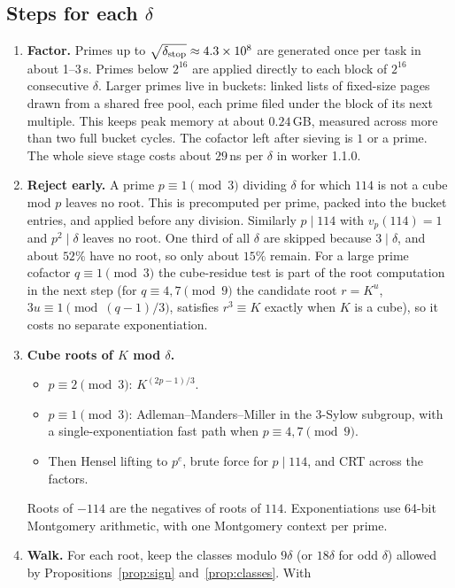 \documentclass[11pt,a4paper]{article}
\theoremstyle{remark}
\begin{document}
\subsection{Steps for each \texorpdfstring{$\delta$}{delta}}
\begin{enumerate}[leftmargin=*]
\item \textbf{Factor.} Primes up to $\sqrt{\delta_{\rm stop}}\approx4.3\times10^8$ are
generated once per task in about 1--3\,s. Primes below $2^{16}$ are applied directly to each
block of $2^{16}$ consecutive $\delta$. Larger primes live in buckets: linked lists of
fixed-size pages drawn from a shared free pool, each prime filed under the block of its next
multiple. This keeps peak memory at about $0.24$\,GB, measured across more than two full
bucket cycles. The cofactor left after sieving is $1$ or a prime. The whole sieve stage costs
about $29$\,ns per $\delta$ in worker 1.1.0.
\item \textbf{Reject early.} A prime $p\equiv1\pmod3$ dividing $\delta$ for which $114$ is
not a cube mod $p$ leaves no root. This is precomputed per prime, packed into the bucket
entries, and applied before any division. Similarly $p\mid114$ with $v_p(114)=1$ and
$p^2\mid\delta$ leaves no root. One third of all $\delta$ are skipped because $3\mid\delta$,
and about $52\%$ have no root, so only about $15\%$ remain. For a large prime cofactor
$q\equiv1\pmod3$ the cube-residue test is part of the root computation in the next step (for
$q\equiv4,7\pmod9$ the candidate root $r=K^u$, $3u\equiv1\pmod{(q-1)/3}$, satisfies $r^3\equiv K$
exactly when $K$ is a cube), so it costs no separate exponentiation.
\item \textbf{Cube roots of $K$ mod $\delta$.}
  \begin{itemize}
    \item $p\equiv2\pmod3$: $K^{(2p-1)/3}$.
    \item $p\equiv1\pmod3$: Adleman--Manders--Miller in the $3$-Sylow subgroup, with a
    single-exponentiation fast path when $p\equiv4,7\pmod9$.
    \item Then Hensel lifting to $p^e$, brute force for $p\mid114$, and CRT across the
    factors.
  \end{itemize}
  Roots of $-114$ are the negatives of roots of $114$. Exponentiations use 64-bit
  Montgomery arithmetic, with one Montgomery context per prime.
\item \textbf{Walk.} For each root, keep the classes modulo $9\delta$ (or $18\delta$ for odd
$\delta$) allowed by Propositions~\ref{prop:sign} and~\ref{prop:classes}. With

\end{enumerate}
\end{document}
